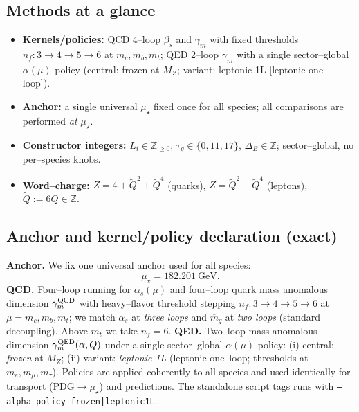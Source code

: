 \documentclass[epjc3]{svjour3}
\begin{document}
\subsection*{Methods at a glance}
\begin{itemize}
  \item \textbf{Kernels/policies:} QCD 4--loop $\beta_s$ and $\gamma_m$ with fixed thresholds $n_f:3\to4\to5\to6$ at $m_c,m_b,m_t$; QED 2--loop $\gamma_m$ with a single sector--global $\alpha(\mu)$ policy (central: frozen at $M_Z$; variant: leptonic 1L [leptonic one--loop]).
  \item \textbf{Anchor:} a single universal $\mu_\star$ fixed once for all species; all comparisons are performed \emph{at} $\mu_\star$.
  \item \textbf{Constructor integers:} $L_i\in\mathbb Z_{\ge0}$, $\tau_g\in\{0,11,17\}$, $\Delta_B\in\mathbb Z$; sector--global, no per--species knobs.
  \item \textbf{Word--charge:} $Z=4+\tilde Q^2+\tilde Q^4$ (quarks), $Z=\tilde Q^2+\tilde Q^4$ (leptons), $\tilde Q:=6Q\in\mathbb Z$.
\end{itemize}

\subsection*{Anchor and kernel/policy declaration (exact)}
\noindent\textbf{Anchor.} We fix one universal anchor used for all species:
\[
  \mu_\star = 182.201~\text{GeV}.
\]
\noindent\textbf{QCD.} Four--loop running for $\alpha_s(\mu)$ and four--loop quark mass anomalous dimension $\gamma^{\rm QCD}_m$ with heavy--flavor threshold stepping
\(
  n_f: 3\!\to\!4\!\to\!5\!\to\!6
\)
at $\mu=m_c, m_b, m_t$; we match $\alpha_s$ at \emph{three loops} and $\overline m_q$ at \emph{two loops} (standard decoupling). Above $m_t$ we take $n_f=6$. \textbf{QED.} Two--loop mass anomalous dimension $\gamma^{\rm QED}_m(\alpha,Q)$ under a single sector--global $\alpha(\mu)$ policy: (i) central: \emph{frozen} at $M_Z$; (ii) variant: \emph{leptonic 1L} (leptonic one--loop; thresholds at $m_e,m_\mu,m_\tau$). Policies are applied coherently to all species and used identically for transport (PDG$\to\mu_\star$) and predictions. The standalone script tags runs with \texttt{--alpha-policy frozen|leptonic1L}.
\end{document}
